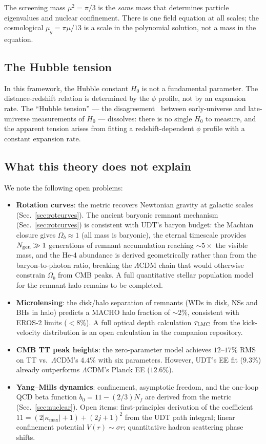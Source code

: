 \documentclass[aps,prd,twocolumn,superscriptaddress,nofootinbib,longbibliography]{revtex4-2}
\newcommand{\kmax}{|\kappa_{\mathrm{max}}|}
\newcommand{\mug}{\mu_g}
\begin{document}
The screening mass $\mu^2 = \pi/3$ is the \emph{same} mass that
determines particle eigenvalues and nuclear confinement.  There is one
field equation at all scales; the cosmological $\mug = \pi\mu/13$ is a
scale in the polynomial solution, not a mass in the equation.

\subsection{The Hubble tension}

In this framework, the Hubble constant $H_0$ is not a fundamental
parameter.  The distance-redshift relation is determined by the
$\phi$ profile, not by an expansion rate.  The ``Hubble tension'' ---
the disagreement~\cite{Riess2022,Verde2019} between early-universe and late-universe
measurements of $H_0$ --- dissolves: there is no single $H_0$ to
measure, and the apparent tension arises from fitting a
redshift-dependent $\phi$ profile with a constant expansion rate.

\subsection{What this theory does not explain}

We note the following open problems:
\begin{itemize}
\item \textbf{Rotation curves}: the metric recovers Newtonian gravity
  at galactic scales (Sec.~\ref{sec:rotcurves}).  The ancient baryonic
  remnant mechanism (Sec.~\ref{sec:rotcurves}) is consistent with UDT's
  baryon budget: the Machian closure gives $\Omega_b \approx 1$ (all
  mass is baryonic), the eternal timescale provides
  $N_{\rm gen} \gg 1$ generations of remnant accumulation reaching
  $\sim 5\times$ the visible mass, and the He-4 abundance is derived
  geometrically rather than from the baryon-to-photon ratio, breaking
  the $\Lambda$CDM chain that would otherwise constrain $\Omega_b$
  from CMB peaks.  A full quantitative stellar population model for
  the remnant halo remains to be completed.
\item \textbf{Microlensing}: the disk/halo separation of remnants (WDs
  in disk, NSs and BHs in halo) predicts a MACHO halo fraction of
  $\sim 2\%$, consistent with EROS-2 limits ($< 8\%$).  A full optical
  depth calculation $\tau_{\rm LMC}$ from the kick-velocity
  distribution is an open calculation in the companion repository.
\item \textbf{CMB TT peak heights}: the zero-parameter model achieves
  $12$--$17\%$ RMS on TT vs.\ $\Lambda$CDM's $4.4\%$ with six
  parameters.  However, UDT's EE fit ($9.3\%$) already outperforms
  $\Lambda$CDM's Planck EE ($12.6\%$).
\item \textbf{Yang--Mills dynamics}: confinement, asymptotic freedom,
  and the one-loop QCD beta function
  $b_0 = 11 - (2/3)N_f$ are derived from the metric
  (Sec.~\ref{sec:nuclear}).  Open items: first-principles derivation
  of the coefficient $11 = (2\kmax+1) + (2j+1)^2$ from the UDT path
  integral; linear confinement potential $V(r) \sim \sigma r$;
  quantitative hadron scattering phase shifts.
\end{itemize}
\end{document}
